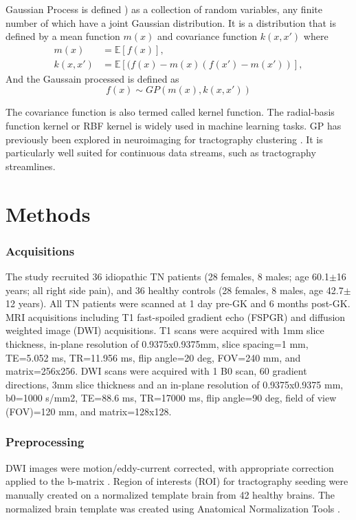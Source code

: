 Gaussian Process is defined \cite{rasmussen2006gaussian}) as a collection of random variables, any finite number of which have a joint Gaussian distribution. 
It is a distribution that is defined by a mean function $m(x)$ and covariance function $k(x,x') $ where
\begin{equation}
	\begin{split}
		m(x) &= \mathbb{E}[f(x)], \\
		k(x,x') &= \mathbb{E}[(f(x)-m(x)(f(x')-m(x'))],
	\end{split}
\end{equation}
And the Gaussain processed is defined as
\begin{equation}
f(x) \sim GP(m(x), k(x, x')) 
\end{equation}

The covariance function is also termed called kernel function. The radial-basis function kernel or RBF kernel is widely used in machine learning tasks. GP has previously been explored in neuroimaging for tractography clustering \cite{Wassermann2010}. It is particularly well suited for continuous data streams, such as tractography streamlines. 

\section{Methods}
\subsubsection{Acquisitions}
The study recruited 36 idiopathic TN patients (28 females, 8 males; age 60.1$\pm$16 years; all right side pain), and 36 healthy controls (28 females, 8 males, age 42.7$\pm$12 years).  All TN patients were scanned at 1 day pre-GK and 6 months post-GK. MRI acquisitions including T1 fast-spoiled gradient echo (FSPGR) and diffusion weighted image (DWI) acquisitions. T1 scans were acquired with 1mm slice thickness, in-plane resolution of 0.9375x0.9375mm, slice spacing=1 mm, TE=5.052 ms, TR=11.956 ms, flip angle=20 deg, FOV=240 mm, and matrix=256x256. DWI scans were acquired with 1 B0 scan, 60 gradient directions, 3mm slice thickness and an in-plane resolution of 0.9375x0.9375 mm, b0=1000 s/mm2, TE=88.6 ms, TR=17000 ms, flip angle=90 deg, field of view (FOV)=120 mm, and matrix=128x128.

\subsubsection{Preprocessing}
DWI images were motion/eddy-current corrected, with appropriate correction applied to the b-matrix \cite{Leemans2009}. Region of interests (ROI) for tractography seeding were manually created on a normalized template brain from 42 healthy brains. The normalized brain template was created using Anatomical Normalization Tools \cite{Avants2010,Avants2011}. 

